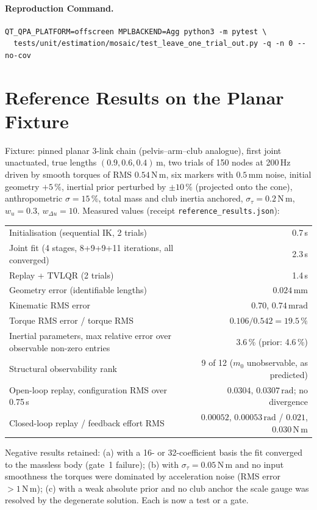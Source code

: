 \documentclass[11pt,a4paper]{article}
\begin{document}
\paragraph{Reproduction Command.}
\begin{verbatim}
QT_QPA_PLATFORM=offscreen MPLBACKEND=Agg python3 -m pytest \
  tests/unit/estimation/mosaic/test_leave_one_trial_out.py -q -n 0 --no-cov
\end{verbatim}

\section{Reference Results on the Planar Fixture}
\label{sec:results}
Fixture: pinned planar 3-link chain (pelvis--arm--club analogue), first joint
unactuated, true lengths $(0.9,0.6,0.4)\,\mathrm{m}$, two trials of 150 nodes
at 200\,Hz driven by smooth torques of RMS $0.54\,\mathrm{N\,m}$, six markers
with $0.5\,\mathrm{mm}$ noise, initial geometry $+5\,\%$, inertial prior
perturbed by $\pm10\,\%$ (projected onto the cone), anthropometric
$\sigma=15\,\%$, total mass and club inertia anchored, $\sigma_\tau=0.2\,\mathrm{N\,m}$,
$w_u=0.3$, $w_{\Delta u}=10$.  Measured values (receipt \texttt{reference\_results.json}):
\begin{center}
\begin{tabular}{@{}l r@{}}
\toprule
Initialisation (sequential IK, 2 trials) & 0.7\,s \\
Joint fit (4 stages, 8+9+9+11 iterations, all converged) & 2.3\,s \\
Replay + TVLQR (2 trials) & 1.4\,s \\
\midrule
Geometry error (identifiable lengths) & $0.024\,\mathrm{mm}$ \\
Kinematic RMS error & $0.70$, $0.74\,\mathrm{mrad}$ \\
Torque RMS error / torque RMS & $0.106/0.542 = 19.5\,\%$ \\
Inertial parameters, max relative error over observable non-zero entries & 3.6\,\% (prior: 4.6\,\%) \\
Structural observability rank & 9 of 12 ($m_0$ unobservable, as predicted) \\
Open-loop replay, configuration RMS over 0.75\,s & $0.0304$, $0.0307\,\mathrm{rad}$; no divergence \\
Closed-loop replay / feedback effort RMS & $0.00052$, $0.00053\,\mathrm{rad}$ / $0.021$, $0.030\,\mathrm{N\,m}$ \\
\bottomrule
\end{tabular}
\end{center}
Negative results retained: (a) with a 16- or 32-coefficient basis the fit
converged to the massless body (gate~1 failure); (b) with $\sigma_\tau=0.05\,\mathrm{N\,m}$
and no input smoothness the torques were dominated by acceleration noise
(RMS error $>1\,\mathrm{N\,m}$); (c) with a weak absolute prior and no club
anchor the scale gauge was resolved by the degenerate solution.  Each is now a
test or a gate.
\end{document}
